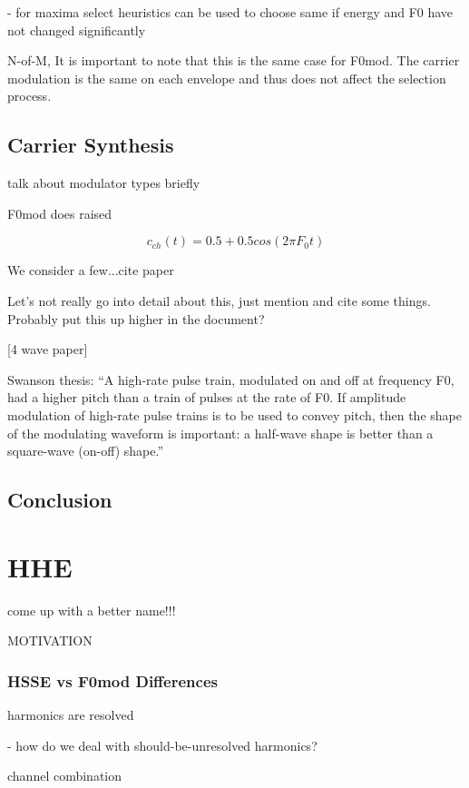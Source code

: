 \documentclass [11pt, proquest] {uwthesis}[2015/03/03]
\begin{document}
 - for maxima select heuristics can be used to choose same if energy and F0 have not changed significantly
 


N-of-M, It is important to note that this is the same case for F0mod.  The carrier modulation is the same on each envelope and thus does not affect the selection process.
 
 


\section{Carrier Synthesis}

talk about modulator types briefly

F0mod does raised

$$c_{ch}(t) = 0.5 + 0.5cos(2\pi F_0t)$$


We consider a few...cite paper

Let's not really go into detail about this, just mention and cite some things.  Probably put this up higher in the document?

[4 wave paper]

Swanson thesis: ``A high-rate pulse train, modulated on and off at frequency F0, had a higher pitch than a train of pulses at the rate of F0. If amplitude modulation of high-rate pulse trains is to be used to convey pitch, then the shape of the modulating waveform is important: a half-wave shape is better than a square-wave (on-off) shape.''


\section{Conclusion}




\chapter{HHE}
come up with a better name!!!

MOTIVATION

\subsection{HSSE vs F0mod Differences}

harmonics are resolved

 - how do we deal with should-be-unresolved harmonics?

channel combination
\end{document}
